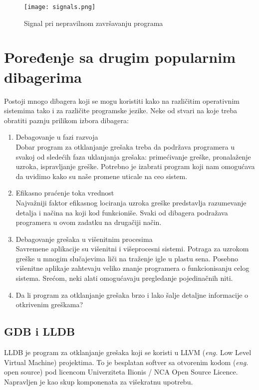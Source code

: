 \documentclass[a4paper]{article}
\begin{document}
\begin{figure}[h!]
\begin{center}
\texttt{[image: signals.png]}
\end{center}
\caption{Signal pri nepravilnom završavanju programa}
\label{fig:signals}
\end{figure}


\section{Poređenje sa drugim popularnim dibagerima}
\label{sec:poredjenje}
Postoji mnogo dibagera koji se mogu koristiti kako
na različitim operativnim sistemima tako i za različite programske jezike. 
Neke od stvari na koje treba obratiti paznju prilikom izbora dibagera:

\begin{enumerate}
\item Debagovanje u fazi razvoja \\
Dobar program za otklanjanje grešaka treba da podržava
programera u svakoj od sledećih faza uklanjanja grešaka:
primećivanje greške, pronalaženje uzroka, ispravljanje greške.
Potrebno je izabrati program koji nam omogućava da uvidimo kako
su naše promene uticale na ceo sistem.
\item Efikasno praćenje toka vrednost\\
Najvažniji faktor efikasnog lociranja uzroka greške predstavlja
razumevanje detalja i načina na koji kod funkcioniše. Svaki od
dibagera podražava programera u ovom zadatku na drugačiji način.
\item Debagovanje grešaka u višenitnim procesima\\
Savremene aplikacije su višenitni i višeprocesni sistemi. 
Potraga za uzrokom greške u mnogim slučajevima liči na traženje igle
u plastu sena. Posebno višenitne aplikaje zahtevaju veliko znanje
programera o funkcionisanju celog sistema.\cite{tools} 
Srećom, neki alati omogućavaju pregledanje pojedinačnih niti.
\item Da li program za otklanjanje grešaka brzo i lako šalje detaljne informacije o otkrivenim greškama?
\end{enumerate}

\subsection{GDB i LLDB}
\label{subsec:lldb}
LLDB je program za otklanjanje grešaka koji se koristi u LLVM 
(\textit{eng.} Low Level Virtual Machine) projektima. To je besplatan softver sa 
otvorenim kodom (\textit{eng.} open source) pod licencom 
Univerziteta Ilionis / NCA Open Source Licence. Napravljen je kao 
skup komponenata za višekratnu upotrebu. \cite{lldb}
\end{document}
